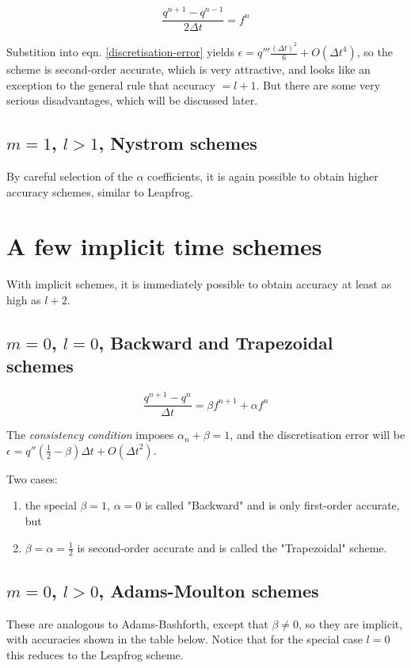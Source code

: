 \begin{equation}
	\frac{q^{n+1}-q^{n-1}}{2 \Delta t} = f^n
	\label{Leapfrog}
\end{equation}

Substition into eqn. \ref{discretisation-error} yields $\epsilon = q'''\frac{(\Delta t)^2}{6} + O({\Delta t}^4)$, so the scheme is second-order accurate, which is very attractive, and looks like an exception to the general rule that accuracy $=l+1$. But there are some very serious disadvantages, which will be discussed later.

\subsection{$m=1$, $l>1$, Nystrom schemes}
By careful selection of the $\alpha$ coefficients, it is again possible to obtain higher accuracy schemes, similar to Leapfrog.

\section{A few implicit time schemes}
With implicit schemes, it is immediately possible to obtain accuracy at least as high as $l+2$.

\subsection{$m=0$, $l=0$, Backward and Trapezoidal schemes}

\begin{equation}
	\frac{q^{n+1}-q^{n}}{\Delta t} = \beta f^{n+1} + \alpha f^n
	\label{Implicit}
\end{equation}

The \emph{consistency condition} imposes $\alpha_n + \beta =1$, and the discretisation error will be $\epsilon = q'' \left( \frac{1}{2} -\beta \right) \Delta t + O({\Delta t}^2)$.

Two cases: 
\begin{enumerate}
\item the special $\beta = 1$, $\alpha=0$ is called "Backward" and is only first-order accurate, but 
\item $\beta = \alpha=\frac{1}{2}$ is second-order accurate and is called the "Trapezoidal" scheme.
\end{enumerate}

\subsection{$m=0$, $l>0$, Adams-Moulton schemes}
These are analogous to Adams-Bashforth, except that $\beta \ne 0$, so they are implicit, with accuracies shown in the table below. Notice that for the special case $l=0$ this reduces to the Leapfrog scheme.

